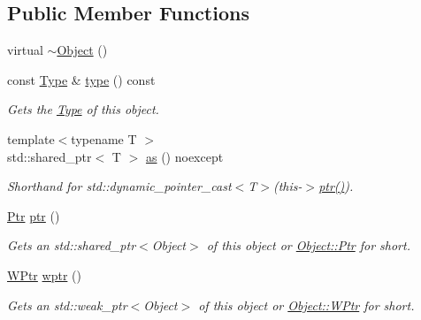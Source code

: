 \subsection*{Public Member Functions}
\begin{DoxyCompactItemize}
\item 
virtual \hyperlink{classdg_1_1deepcore_1_1_object_a8befb926551636306a45863281789d2e}{$\sim$\+Object} ()
\item 
const \hyperlink{classdg_1_1deepcore_1_1_type}{Type} \& \hyperlink{classdg_1_1deepcore_1_1_object_a80356589437cb086680c6b5fbd8044d4}{type} () const 
\begin{DoxyCompactList}\small\item\em Gets the \hyperlink{classdg_1_1deepcore_1_1_type}{Type} of this object. \end{DoxyCompactList}\item 
{\footnotesize template$<$typename T $>$ }\\std\+::shared\+\_\+ptr$<$ T $>$ \hyperlink{classdg_1_1deepcore_1_1_object_ac90291fa8d78643bcb2856bf5744034b}{as} () noexcept
\begin{DoxyCompactList}\small\item\em Shorthand for {\ttfamily std\+::dynamic\+\_\+pointer\+\_\+cast$<$\+T$>$(this-\/$>$\hyperlink{classdg_1_1deepcore_1_1_object_a8b8b14a44dd1164568619897713753f0}{ptr()})}. \end{DoxyCompactList}\item 
\hyperlink{classdg_1_1deepcore_1_1_object_a4565c5c2ba828aaaa4354befbac8b2f9}{Ptr} \hyperlink{classdg_1_1deepcore_1_1_object_a8b8b14a44dd1164568619897713753f0}{ptr} ()
\begin{DoxyCompactList}\small\item\em Gets an std\+::shared\+\_\+ptr$<$\+Object$>$ of this object or \hyperlink{classdg_1_1deepcore_1_1_object_a4565c5c2ba828aaaa4354befbac8b2f9}{Object\+::\+Ptr} for short. \end{DoxyCompactList}\item 
\hyperlink{classdg_1_1deepcore_1_1_object_ab4d85713f22f753fff52e1d4a2769251}{W\+Ptr} \hyperlink{classdg_1_1deepcore_1_1_object_a7b95cfaa0683b7e9cd7dea00b1605ac1}{wptr} ()
\begin{DoxyCompactList}\small\item\em Gets an std\+::weak\+\_\+ptr$<$\+Object$>$ of this object or \hyperlink{classdg_1_1deepcore_1_1_object_ab4d85713f22f753fff52e1d4a2769251}{Object\+::\+W\+Ptr} for short. \end{DoxyCompactList}\item 

\end{DoxyCompactItemize}
